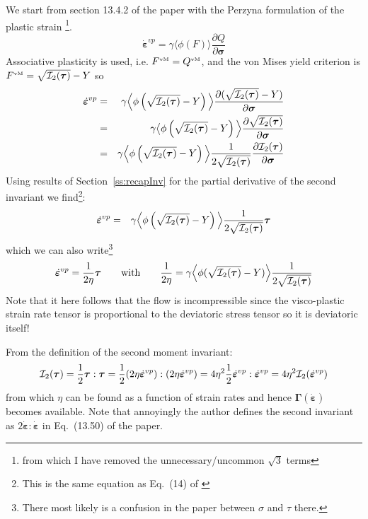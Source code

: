 We start from section 13.4.2 of the paper with the Perzyna formulation of the plastic strain
\footnote{from which I have removed the unnecessary/uncommon $\sqrt 3$ terms}. 
\[
\dot{\bm \varepsilon}^{vp} = \gamma \langle \phi(F) \rangle \frac{\partial Q}{\partial \bm\sigma}
\]
Associative plasticity is used, i.e. $F^{\text{\tiny vM}}=Q^{\text{\tiny vM}}$, and the von Mises yield
criterion is $F^{\text{\tiny vM}}=\sqrt{{\cal I}_2(\bm \tau)}- Y$ so
\begin{eqnarray}
\dot{\bm \varepsilon}^{vp} 
&=& \gamma \Big\langle \phi\left(\sqrt{{\cal I}_2(\bm \tau)}- Y\right)  \Big\rangle 
\frac{\partial (\sqrt{{\cal I}_2(\bm \tau)}- Y)}{\partial \bm\sigma} \nonumber\\
&=& \gamma \big\langle \phi\left(\sqrt{{\cal I}_2(\bm \tau)}- Y\right)  \Big\rangle 
\frac{\partial \sqrt{{\cal I}_2(\bm \tau)}}{\partial \bm\sigma} \nonumber\\
&=& \gamma \Big\langle \phi\left(\sqrt{{\cal I}_2(\bm \tau)}- Y\right)  \Big\rangle 
\frac{1}{2 \sqrt{{\cal I}_2(\bm \tau)}} \frac{\partial {\cal I}_2(\bm \tau)}{\partial \bm\sigma}
\end{eqnarray}
Using results of Section~\ref{ss:recapInv} for the partial derivative of the second invariant
we find\footnote{This is the same equation as Eq.~(14) of 
\textcite{zijo78}}:
\begin{eqnarray}
\dot{\bm \varepsilon}^{vp} 
&=& \gamma \Big\langle \phi\left(\sqrt{{\cal I}_2(\bm \tau)}- Y \right)  \Big\rangle 
\frac{1}{2 \sqrt{{\cal I}_2(\bm \tau)}} {\bm \tau}
\end{eqnarray}
which we can also write\footnote{There most likely is a confusion in 
the paper between $\sigma$ and $\tau$ there.}
\[
\dot{\bm \varepsilon}^{vp} =
\frac{1}{2\eta} \bm\tau
\qquad
{\rm with}
\qquad
\frac{1}{2\eta} = \gamma \Big\langle \phi(\sqrt{{\cal I}_2(\bm \tau)}- Y) \Big\rangle 
\frac{1}{2 \sqrt{{\cal I}_2(\bm \tau)}}
\]
Note that it here follows that the flow is incompressible since 
the visco-plastic strain rate tensor is proportional to the deviatoric stress tensor
so it is deviatoric itself!


From the definition of the second moment invariant:
\[
{\cal I}_2(\bm\tau)
=\frac12 \bm\tau:\bm\tau 
=\frac12 (2\eta \dot{\bm \varepsilon}^{vp}):(2\eta \dot{\bm \varepsilon}^{vp})
=4 \eta^2   \frac12 \dot{\bm \varepsilon}^{vp}: \dot{\bm \varepsilon}^{vp}
=4\eta^2 {\cal I}_2(\dot{\bm \varepsilon}^{vp})
\]
from which $\eta$ can be found as a function of strain rates and 
hence $\bm\Gamma(\dot{\bm\varepsilon})$ becomes available.
Note that annoyingly the author defines the second invariant as 
$2 \dot{\bm\varepsilon}:\dot{\bm\varepsilon}$ in Eq.~(13.50) of the paper.

